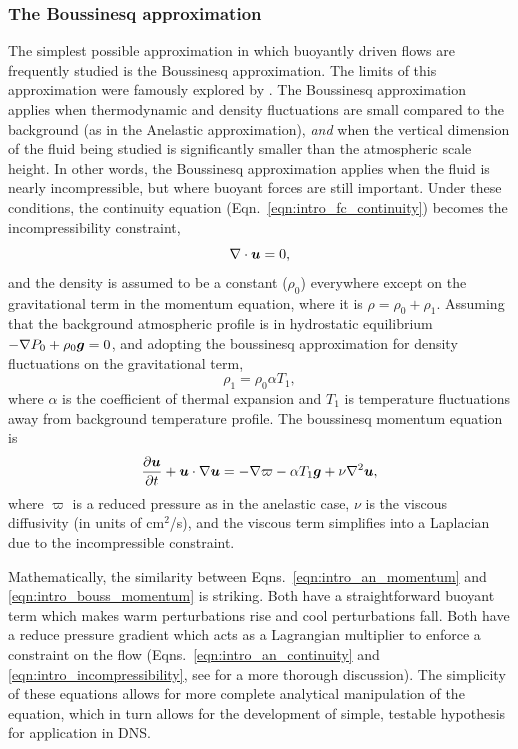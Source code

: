 \subsubsection{The Boussinesq approximation}
The simplest possible approximation in which buoyantly driven flows are frequently studied is the Boussinesq approximation.
The limits of this approximation were famously explored by \citet{spiegel&veronis1960}.
The Boussinesq approximation applies when thermodynamic and density fluctuations are small compared to the background (as in the Anelastic approximation), \emph{and} when the vertical dimension of the fluid being studied is significantly smaller than the atmospheric scale height.
In other words, the Boussinesq approximation applies when the fluid is nearly incompressible, but where buoyant forces are still important.
Under these conditions, the continuity equation (Eqn.~\ref{eqn:intro_fc_continuity}) becomes the incompressibility constraint,
\begin{equation}
\nabla\cdot\bm{u} = 0,
\label{eqn:intro_incompressibility}
\end{equation}
and the density is assumed to be a constant ($\rho_0$) everywhere except on the gravitational term in the momentum equation, where it is $\rho = \rho_0 + \rho_1$.
Assuming that the background atmospheric profile is in hydrostatic equilibrium $-\nabla P_0 + \rho_0 \bm{g} = 0$, and adopting the boussinesq approximation for density fluctuations on the gravitational term,
\begin{equation}
\rho_1 = \rho_0\alpha T_1,
\end{equation}
where $\alpha$ is the coefficient of thermal expansion and $T_1$ is temperature fluctuations away from background temperature profile.
The boussinesq momentum equation is
\begin{equation}
\frac{\partial \bm{u}}{\partial t} + \bm{u}\cdot\nabla\bm{u} = -\nabla \varpi - \alpha T_1 \bm{g} + \nu \nabla^2 \bm{u},
\label{eqn:intro_bouss_momentum}
\end{equation}
where $\varpi$ is a reduced pressure as in the anelastic case, $\nu$ is the viscous diffusivity (in units of cm$^2$/s), and the viscous term simplifies into a Laplacian due to the incompressible constraint.

Mathematically, the similarity between Eqns.~\ref{eqn:intro_an_momentum} and \ref{eqn:intro_bouss_momentum} is striking.
Both have a straightforward buoyant term which makes warm perturbations rise and cool perturbations fall.
Both have a reduce pressure gradient which acts as a Lagrangian multiplier to enforce a constraint on the flow (Eqns.~\ref{eqn:intro_an_continuity} and \ref{eqn:intro_incompressibility}, see \citet{vasil&all2013} for a more thorough discussion).
The simplicity of these equations allows for more complete analytical manipulation of the equation, which in turn allows for the development of simple, testable hypothesis for application in DNS.

